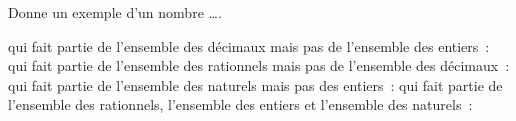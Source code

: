 %
%
Donne un exemple d'un nombre \dots.
  \begin{tasks}
    \task qui fait partie de l'ensemble des décimaux mais pas de l'ensemble des entiers~: \dotfill
    \task qui fait partie de l'ensemble des rationnels mais pas de l'ensemble des décimaux~: \dotfill
    \task qui fait partie de l'ensemble des naturels mais pas des entiers~: \dotfill
    \task qui fait partie de l'ensemble des rationnels, l'ensemble des entiers et l'ensemble des naturels~: \dotfill
  \end{tasks}
